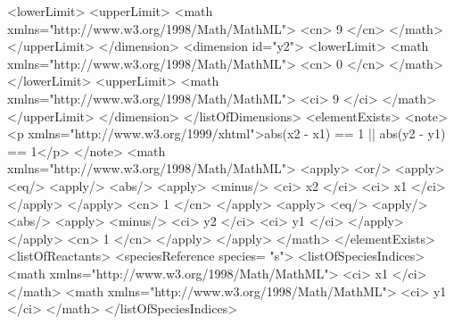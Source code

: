 \documentclass{cekarticle}
\begin{document}
\begin{example}
                    <lowerLimit>
                    <upperLimit>
                        <math xmlns="http://www.w3.org/1998/Math/MathML">
                            <cn> 9 </cn>
                        </math>
                    </upperLimit>
                </dimension>
                <dimension id="y2">
                    <lowerLimit>
                        <math xmlns="http://www.w3.org/1998/Math/MathML">
                            <cn> 0 </cn>
                        </math>
                    </lowerLimit>
                    <upperLimit>
                        <math xmlns="http://www.w3.org/1998/Math/MathML">
                            <ci> 9 </ci>
                        </math>
                    </upperLimit>
                </dimension>
            </listOfDimensions>
            <elementExists>
                <note>
                    <p xmlns="http://www.w3.org/1999/xhtml">abs(x2 - x1) == 1 || abs(y2 - y1) == 1</p>
                </note>                
                <math xmlns="http://www.w3.org/1998/Math/MathML">
                    <apply>
                        <or/>
                        <apply>
                            <eq/>
                            <apply/>
                                <abs/>
                                <apply>
                                    <minus/>
                                    <ci> x2 </ci>
                                    <ci> x1 </ci>
                                </apply>
                            </apply>
                            <cn> 1 </cn>
                        </apply>
                        <apply>
                            <eq/>
                            <apply/>
                                <abs/>
                                <apply>
                                    <minus/>
                                    <ci> y2 </ci>
                                    <ci> y1 </ci>
                                </apply>
                            </apply>
                            <cn> 1 </cn>
                        </apply>
                    </apply>
                </math>
            </elementExists>
            <listOfReactants>
                <speciesReference species= "s">
                    <listOfSpeciesIndices>
                        <math xmlns="http://www.w3.org/1998/Math/MathML">
                            <ci> x1 </ci>
                        </math>
                        <math xmlns="http://www.w3.org/1998/Math/MathML">
                            <ci> y1 </ci>
                        </math>
                    </listOfSpeciesIndices>

\end{example}
\end{document}

